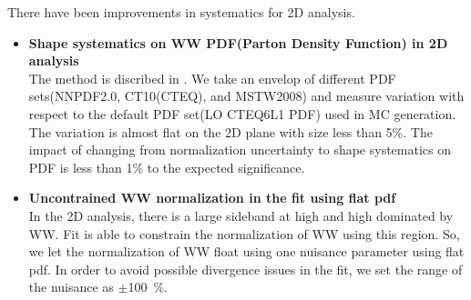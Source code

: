 There have been improvements in systematics for 2D analysis.

\begin{itemize}

    \item \textbf{Shape systematics on WW PDF(Parton Density Function) in 2D analysis}  \\
        The method is discribed in \cite{AcceptUncert}. We take an envelop of different 
        PDF sets(NNPDF2.0, CT10(CTEQ), and MSTW2008) and measure variation with respect 
        to the default PDF set(LO CTEQ6L1 PDF) used in MC generation. The variation is 
        almost flat on the 2D plane with size less than 5\%. The impact of changing from 
        normalization uncertainty to shape systematics on PDF is less than 1\% to the 
        expected significance.

    \item \textbf{Uncontrained WW normalization in the fit using flat pdf}  \\   
        In the 2D analysis, there is a large sideband at high \mt and high \mll 
        dominated by WW. Fit is able to constrain the normalization of WW using this region. 
        So, we let the normalization of WW float using one nuisance parameter using flat pdf. 
        In order to avoid possible divergence issues in the fit, we set the range 
        of the nuisance as $\pm$100~\%. 

\end{itemize}



